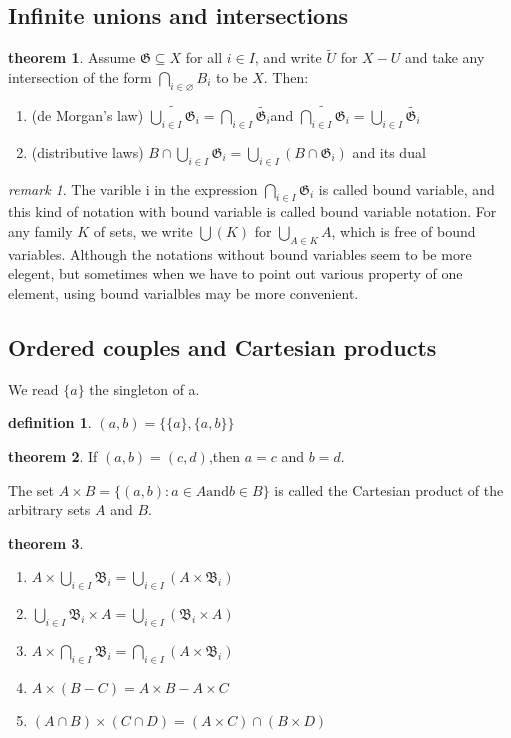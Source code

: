 \documentclass[a4paper,11pt]{article}%
\theoremstyle{remark}
\newtheorem*{remark}{remark}
\theoremstyle{definition}
\newtheorem{theorem}{theorem}[section]
\theoremstyle{definition}
\newtheorem*{definition}{definition}
\theoremstyle{plain}
\theoremstyle{definition}
\begin{document}
\subsection{Infinite unions and intersections}
\begin{theorem}
    Assume $\mathfrak{G} \subseteq X$ for all $i\in I$, and write $\tilde{U}$
    for $X-U$ and take any intersection of the form $\bigcap _{i\in \varnothing}B_i$ 
    to be $X$. Then:
    \begin{enumerate}
        \item (de Morgan's law) $\widetilde{\bigcup _{i\in I}\mathfrak{G}_i }=\bigcap_{i\in I}\tilde{\mathfrak{G}_i}$and $\widetilde{\bigcap _{i\in I}\mathfrak{G}_i }=\bigcup_{i\in I}\tilde{\mathfrak{G}_i}$
        \item (distributive laws) $B\cap \bigcup _{i\in I }\mathfrak{G}_i=\bigcup_{i\in I}(B\cap \mathfrak{G}_i)$ and its dual
    \end{enumerate}
\end{theorem}
\begin{remark}
    The varible i in the expression $\bigcap_{i\in I}\mathfrak{G}_i$ is called 
    bound variable, and this kind of notation with bound variable is called 
    bound variable notation. For any family $K$ of sets, we write $\bigcup (K)$ for $\bigcup_{A\in K}A$,
    which is free of bound variables. Although the notations without bound variables seem
    to be more elegent, but sometimes when we have to point out various property of one 
    element, using bound varialbles may be more convenient.
\end{remark}
\subsection{Ordered couples and Cartesian products}
We read $\{a\}$ the singleton of a.

\begin{definition}
    $(a,b)=\{\{a\},\{a,b\}\}$
\end{definition}
\begin{theorem}
    If $(a,b)=(c,d)$,then $a=c$ and $ b=d$.
\end{theorem}

The set $A\times B=\{(a,b):a\in A \text{and} b\in B\}$ is called the Cartesian product of
the arbitrary sets $A$ and $B$.

\begin{theorem}
    \begin{enumerate}
        \item $A\times \bigcup_{i\in I}\mathfrak{B}_i=\bigcup_{i\in I}(A\times \mathfrak{B}_i)$
        \item $\bigcup_{i\in I}\mathfrak{B}_i\times A=\bigcup_{i\in I}(\mathfrak{B}_i\times A)$
        \item $A\times \bigcap_{i\in I}\mathfrak{B}_i=\bigcap_{i\in I}(A\times \mathfrak{B}_i)$
        \item $A\times (B-C)=A\times B-A\times C$
        \item $(A\cap B)\times (C\cap D)=(A\times C)\cap(B\times D)$
    \end{enumerate}
\end{theorem}
\end{document}
